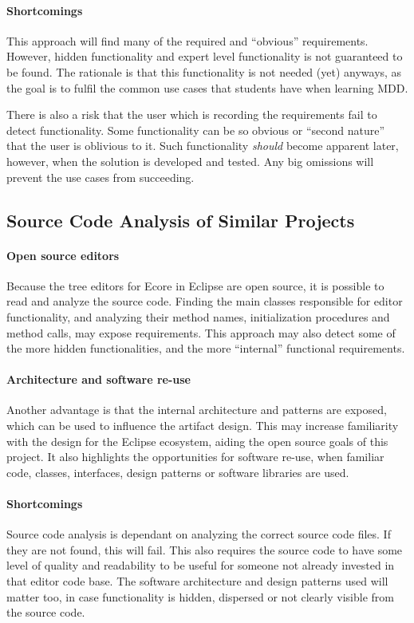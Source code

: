 \paragraph{Shortcomings}
This approach will find many of the required and ``obvious'' requirements.
However, hidden functionality and expert level functionality is not guaranteed to be found.
The rationale is that this functionality is not needed (yet) anyways, as the goal is to fulfil the common use cases that students have when learning \acrshort{MDD}.


There is also a risk that the user which is recording the requirements fail to detect functionality.
Some functionality can be so obvious or ``second nature'' that the user is oblivious to it.
Such functionality \textit{should} become apparent later, however, when the solution is developed and tested.
Any big omissions will prevent the use cases from succeeding.


\subsection{Source Code Analysis of Similar Projects}

\paragraph{Open source editors}
Because the tree editors for \gls{Ecore} in \gls{Eclipse} are \gls{open source}, it is possible to read and analyze the source code.
Finding the main classes responsible for editor functionality, and analyzing their method names, initialization procedures and method calls, may expose requirements.
This approach may also detect some of the more hidden functionalities, and the more ``internal'' functional requirements.


\paragraph{Architecture and software re-use}
Another advantage is that the internal architecture and patterns are exposed, which can be used to influence the artifact design.
This may increase familiarity with the design for the Eclipse ecosystem, aiding the \gls{open source} goals of this project.
It also highlights the opportunities for software re-use, when familiar code, classes, interfaces, design patterns or software libraries are used.


\paragraph{Shortcomings}
Source code analysis is dependant on analyzing the correct source code files.
If they are not found, this will fail.
This also requires the source code to have some level of quality and readability to be useful for someone not already invested in that editor code base.
The software architecture and design patterns used will matter too, in case functionality is hidden, dispersed or not clearly visible from the source code.


